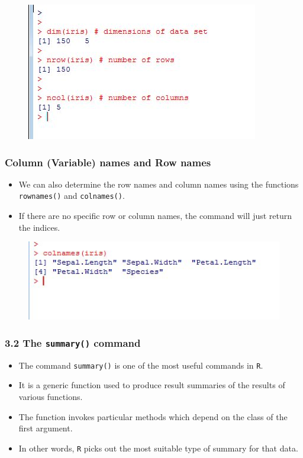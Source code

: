 \documentclass{beamer}
\begin{document}
 	\begin{frame}
 		\begin{figure}
 			\centering
 			\includegraphics[width=0.7\linewidth]{images/dimsiris}
 			\caption{}
 			\label{fig:dimsiris}
 		\end{figure}
 		
 		
 		
 	\end{frame}
 	\begin{frame}
 		\frametitle{Column (Variable) names and Row names}
 		\begin{itemize}
 			\item We can also determine the row names and column names using the functions \texttt{rownames()}
 			and \texttt{colnames()}. 
 			\item If there are no specific row or column names, the command will just return
 			the indices.
 		\end{itemize}
 		\begin{figure}
 			\centering
 			\includegraphics[width=0.7\linewidth]{images/colnamesiris}
 			\caption{}
 			\label{fig:colnamesiris}
 		\end{figure}
 		
 	\end{frame}
 	\begin{frame}
 		\frametitle{3.2 The \texttt{summary()} command}
 		\begin{itemize}
 			\item The command \texttt{summary()} is one of the most useful commands in \texttt{R}. 
 			\item It is a generic function used
 			to produce result summaries of the results of various functions. 
 			\item The function invokes particular
 			methods which depend on the class of the first argument. 
 			\item In other words, \texttt{R} picks out the most
 			suitable type of summary for that data.
 		\end{itemize}
 	\end{frame}
\end{document}
